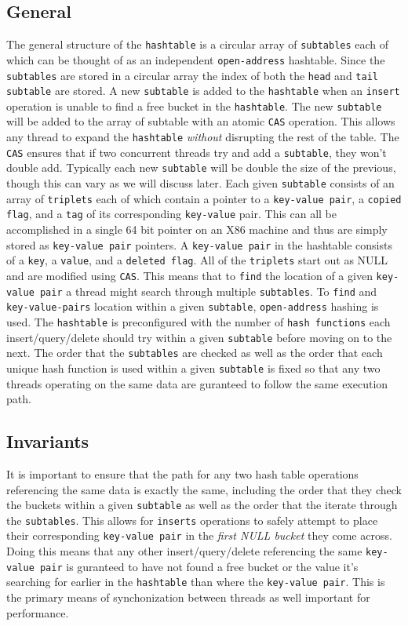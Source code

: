 \subsection{General}
The general structure of the \texttt{hashtable} is a circular array of
\texttt{subtables} each of which can be thought of as an independent
\texttt{open-address} hashtable. Since the \texttt{subtables} are
stored in a circular array the index of both the \texttt{head} and
\texttt{tail} \texttt{subtable} are stored. A new \texttt{subtable} is
added to the \texttt{hashtable} when an \texttt{insert} operation is
unable to find a free bucket in the \texttt{hashtable}. The new
\texttt{subtable} will be added to the array of subtable with an
atomic \texttt{CAS} operation. This allows any thread to expand the
\texttt{hashtable} \textit{without} disrupting the rest of the
table. The \texttt{CAS} ensures that if two concurrent threads try and
add a \texttt{subtable}, they won't double add. Typically each new
\texttt{subtable} will be double the size of the previous, though this
can vary as we will discuss later. Each given \texttt{subtable}
consists of an array of \texttt{triplets} each of which contain a
pointer to a \texttt{key-value pair}, a \texttt{copied flag}, and a
\texttt{tag} of its corresponding \texttt{key-value} pair. This can
all be accomplished in a single 64 bit pointer on an X86 machine and
thus are simply stored as \texttt{key-value pair} pointers. A
\texttt{key-value pair} in the hashtable consists of a \texttt{key}, a
\texttt{value}, and a \texttt{deleted flag}. All of the
\texttt{triplets} start out as NULL and are modified using
\texttt{CAS}. This means that to \texttt{find} the location of a given
\texttt{key-value pair} a thread might search through multiple
\texttt{subtables}. To \texttt{find} and \texttt{key-value-pairs}
location within a given \texttt{subtable}, \texttt{open-address}
hashing is used. The \texttt{hashtable} is preconfigured with the
number of \texttt{hash functions} each insert/query/delete should try
within a given \texttt{subtable} before moving on to the next. The
order that the \texttt{subtables} are checked as well as the order
that each unique hash function is used within a given
\texttt{subtable} is fixed so that any two threads operating on the
same data are guranteed to follow the same execution path.
\subsection{Invariants}
It is important to ensure that the path for any two hash table
operations referencing the same data is exactly the same, including
the order that they check the buckets within a given \texttt{subtable}
as well as the order that the iterate through the
\texttt{subtables}. This allows for \texttt{inserts} operations to
safely attempt to place their corresponding \texttt{key-value pair} in
the \textit{first NULL bucket} they come across. Doing this means that
any other insert/query/delete referencing the same \texttt{key-value
  pair} is guranteed to have not found a free bucket or the value it's
searching for earlier in the \texttt{hashtable} than where the
\texttt{key-value pair}. This is the primary means of synchonization
between threads as well important for performance.
